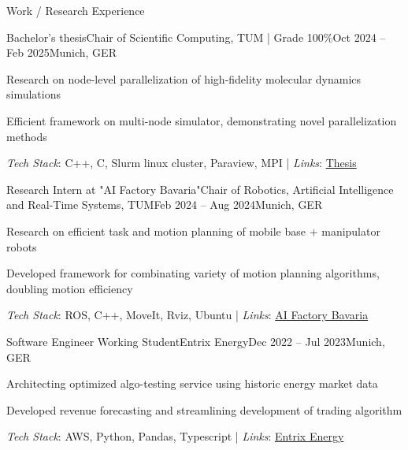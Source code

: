 \documentclass{kyvernitis-resume}
\begin{document}
\begin{section}{Work / Research Experience}

    \begin{subsection}{Bachelor's thesis}{Chair of Scientific Computing, TUM | Grade 100\%}{Oct 2024 -- Feb 2025}{Munich, GER}
    \item{Research on node-level parallelization of high-fidelity molecular dynamics simulations}

    \item{Efficient framework on multi-node simulator, demonstrating novel parallelization methods} 
\end{subsection}
    \textit{Tech Stack}: C++, C, Slurm linux cluster, Paraview, MPI\hspace{0.1cm} | \hspace{0.1cm}
    \textit{Links}: \href{https://mediatum.ub.tum.de/1781358}{Thesis}
    

    \begin{subsection}{Research Intern at "AI Factory Bavaria"}{Chair of Robotics, Artificial Intelligence and Real-Time Systems, TUM}{Feb 2024 -- Aug 2024}{Munich, GER}
    \item Research on efficient task and motion planning of mobile base + manipulator robots
    \item Developed framework for combinating variety of motion planning algorithms, doubling motion efficiency
    \end{subsection}
    \textit{Tech Stack}: ROS, C++, MoveIt, Rviz, Ubuntu\hspace{0.1cm} | \hspace{0.1cm}
    \textit{Links}: \href{https://kifabrik.mirmi.tum.de/}{AI Factory Bavaria}
    

    \begin{subsection}{Software Engineer Working Student}{Entrix Energy}{Dec 2022 -- Jul 2023}{Munich, GER}
        \item Architecting optimized algo-testing service using historic energy market data
        \item Developed revenue forecasting and streamlining development of trading algorithm
    \end{subsection}
    \textit{Tech Stack}: AWS, Python, Pandas, Typescript \hspace{0.1cm} | \hspace{0.1cm}
    \textit{Links}: \href{https://www.entrixenergy.com/en/home/}{Entrix Energy}
    

\end{section}
\end{document}
